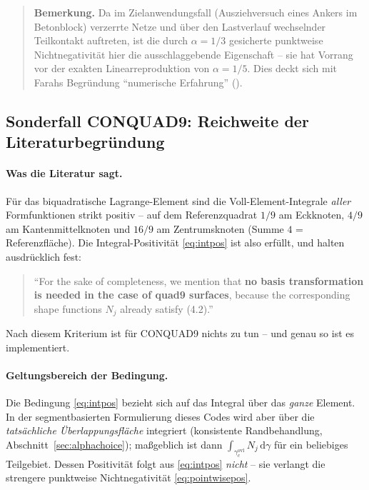 \documentclass[a4paper,11pt]{article}
\def\tfrac#1#2{#1/#2}%
\def\tilde#1{#1}%
\begin{document}
\begin{quote}\small
\textbf{Bemerkung.} Da im Zielanwendungsfall (Ausziehversuch eines Ankers im Betonblock)
verzerrte Netze und über den Lastverlauf wechselnder Teilkontakt auftreten, ist die durch
$\alpha=\tfrac13$ gesicherte punktweise Nichtnegativität hier die ausschlaggebende Eigenschaft --
sie hat Vorrang vor der exakten Linearreproduktion von $\alpha=\tfrac15$. Dies deckt sich mit Farahs
Begründung ``numerische Erfahrung'' (\citealp[Gl.~(6.20)]{farah}).
\end{quote}

\subsection{Sonderfall CONQUAD9: Reichweite der Literaturbegründung}
\label{sec:quad9}

\paragraph{Was die Literatur sagt.} Für das biquadratische Lagrange-Element sind die
Voll-Element-Integrale \emph{aller} Formfunktionen strikt positiv -- auf dem Referenzquadrat
$\tfrac19$ am Eckknoten, $\tfrac49$ am Kantenmittelknoten und $\tfrac{16}9$ am Zentrumsknoten
(Summe $4$ = Referenzfläche). Die Integral-Positivität \eqref{eq:intpos} ist also erfüllt, und
\citet{popp2012} halten ausdrücklich fest:
\begin{quote}
\small ``For the sake of completeness, we mention that \textbf{no basis transformation is needed in
the case of quad9 surfaces}, because the corresponding shape functions $N_j$ already satisfy
(4.2).'' \hfill \citep[S.~B431]{popp2012}
\end{quote}
Nach diesem Kriterium ist für CONQUAD9 nichts zu tun -- und genau so ist es implementiert.

\paragraph{Geltungsbereich der Bedingung.} Die Bedingung \eqref{eq:intpos} bezieht
sich auf das Integral über das \emph{ganze} Element. In der segmentbasierten Formulierung dieses
Codes wird aber über die \emph{tatsächliche Überlappungsfläche} integriert (konsistente
Randbehandlung, Abschnitt~\ref{sec:alphachoice}); maßgeblich ist dann
$\int_{\gamma_c^{\text{ovl}}}\tilde N_j\,\mathrm d\gamma$ für ein beliebiges Teilgebiet. Dessen
Positivität folgt aus \eqref{eq:intpos} \emph{nicht} -- sie verlangt die strengere punktweise
Nichtnegativität \eqref{eq:pointwisepos}.
\end{document}
